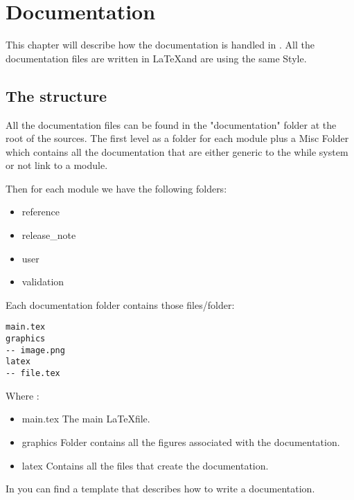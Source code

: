 \chapter{Documentation}

This chapter will describe how the documentation is handled in \telemacsystem.
All the documentation files are written in \LaTeX and are using the same Style.

\section{The structure}
All the documentation files can be found in the "documentation" folder at the
root of the \telemacsystem sources. The first level as a folder for each module
plus a Misc Folder which contains all the documentation that are either generic
to the while system or not link to a module.

Then for each module we have the following folders:
\begin{itemize}
\item reference
\item release\_note
\item user
\item validation
\end{itemize}

Each documentation folder contains those files/folder:
\begin{verbatim}
main.tex
graphics
-- image.png
latex
-- file.tex
\end{verbatim}

Where :
\begin{itemize}
\item main.tex The main \LaTeX file.
\item graphics Folder contains all the figures associated with the
  documentation.
\item latex Contains all the files that create the documentation.
\end{itemize}

In  you can find a template that describes how
to write a \telemacsystem documentation.

